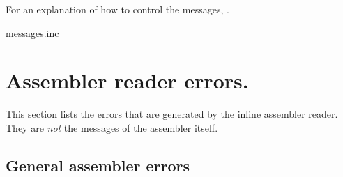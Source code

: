 For an explanation of how to control the messages, .

 {messages.inc}

\section{Assembler reader errors.}

This section lists the errors that are generated by the inline assembler reader.
They are {\em not} the messages of the assembler itself.

\subsection{General assembler errors}
